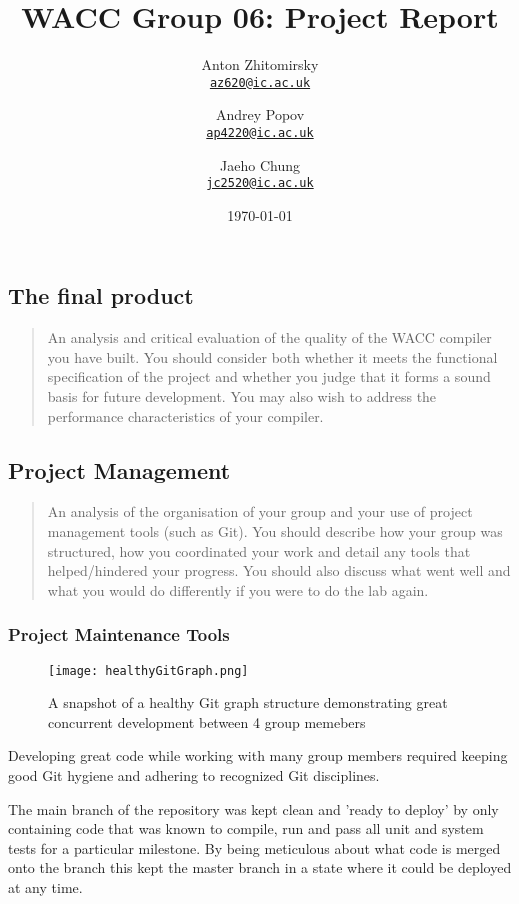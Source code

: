 \documentclass[a4paper,12pt]{article}
\title{WACC Group 06: Project Report}
\author{
    Anton Zhitomirsky \\ \texttt{\href{mailto:ps1620@ic.ac.uk}{az620@ic.ac.uk}}
    \and
    Andrey Popov \\ \texttt{\href{mailto:ap4220@ic.ac.uk}{ap4220@ic.ac.uk}}
    \and
    Jaeho Chung \\ \texttt{\href{mailto:jc2520@ic.ac.uk}{jc2520@ic.ac.uk}}
}
\date\today
\begin{document}
\sloppy

\maketitle

\subsection*{The final product}

\begin{quote}
    An analysis and critical evaluation of the quality of the WACC compiler you
have built. You should consider both whether it meets the functional specification of the project
and whether you judge that it forms a sound basis for future development. You may also wish to
address the performance characteristics of your compiler.
\end{quote}

\subsection*{Project Management}

\begin{quote}
    An analysis of the organisation of your group and your use of project
management tools (such as Git). You should describe how your group was structured, how you
coordinated your work and detail any tools that helped/hindered your progress. You should also
discuss what went well and what you would do differently if you were to do the lab again.

\end{quote}

\subsubsection*{Project Maintenance Tools}

\begin{figure}
  \texttt{[image: healthyGitGraph.png]}
  \caption{A snapshot of a healthy Git graph structure demonstrating great concurrent development between 4 group memebers}
  \label{fig:gitGraph}
\end{figure}

Developing great code while working with many group members required keeping good Git hygiene and adhering to recognized Git disciplines.

The main branch of the repository was kept clean and 'ready to deploy' by only containing code that was known to compile, run and pass all unit and system tests for a particular milestone. By being meticulous about what code is merged onto the branch this kept the master branch in a state where it could be deployed at any time.
\end{document}
